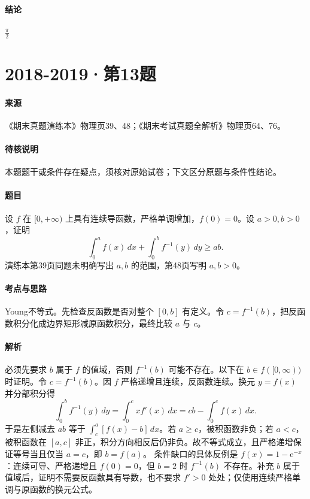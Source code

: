 \documentclass[UTF8,fontset=fandol,12pt,oneside,openany]{ctexrep}
\newcommand{\ee}{\mathrm e}
\theoremstyle{definition}
\begin{document}
\paragraph{结论}
$\frac\pi2$

\par\addvspace{18pt}\noindent\begin{minipage}{\linewidth}
\section{2018-2019·第13题}
\label{exam:11:q21}
\paragraph{来源} 《期末真题演练本》物理页39、48；《期末考试真题全解析》物理页64、76。
\paragraph{待核说明} 本题题干或条件存在疑点，须核对原始试卷；下文区分原题与条件性结论。
\paragraph{题目}
设 $f$ 在 $[0,+\infty)$ 上具有连续导函数，严格单调增加，$f(0)=0$。设 $a>0,b>0$，证明
\[\int_0^a f(x)\,dx+\int_0^b f^{-1}(y)\,dy\ge ab.\]
演练本第39页同题未明确写出 $a,b$ 的范围，第48页写明 $a,b>0$。
\end{minipage}\par
\paragraph{考点与思路}
Young不等式。先检查反函数是否对整个 $[0,b]$ 有定义。令 $c=f^{-1}(b)$，把反函数积分化成边界矩形减原函数积分，最终比较 $a$ 与 $c$。
\paragraph{解析}
必须先要求 $b$ 属于 $f$ 的值域，否则 $f^{-1}(b)$ 可能不存在。以下在 $b\in f([0,\infty))$ 时证明。令 $c=f^{-1}(b)$。因 $f$ 严格递增且连续，反函数连续。换元 $y=f(x)$ 并分部积分得
\[\int_0^b f^{-1}(y)\,dy=\int_0^c x f'(x)\,dx=cb-\int_0^c f(x)\,dx.\]
于是左侧减去 $ab$ 等于 $\int_c^a[f(x)-b]\,dx$。若 $a\ge c$，被积函数非负；若 $a<c$，被积函数在 $[a,c]$ 非正，积分方向相反后仍非负。故不等式成立，且严格递增保证等号当且仅当 $a=c$，即 $b=f(a)$。
条件缺口的具体反例是 $f(x)=1-\ee^{-x}$：连续可导、严格递增且 $f(0)=0$，但 $b=2$ 时 $f^{-1}(b)$ 不存在。补充 $b$ 属于值域后，证明不需要反函数具有导数，也不要求 $f'>0$ 处处；仅使用连续严格单调与原函数的换元公式。
\end{document}

